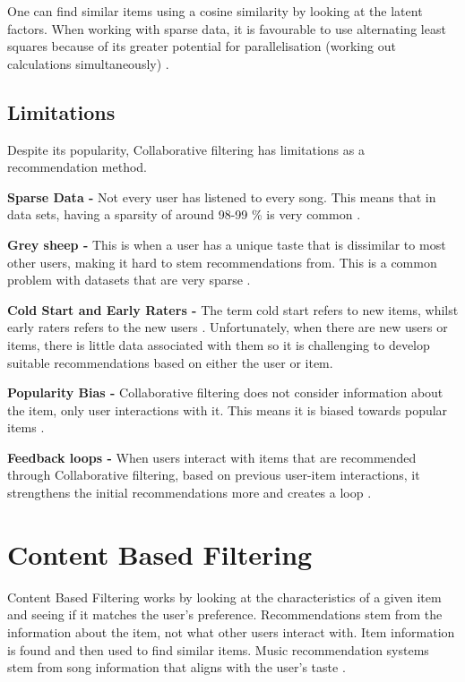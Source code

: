 One can find similar items using a cosine similarity by looking at the latent factors. When working with sparse data, it is favourable to use alternating least squares because of its greater potential for parallelisation (working out calculations simultaneously) \citep{koren_matrix_2009}.

\subsection{Limitations}
Despite its popularity, Collaborative filtering has limitations as a recommendation method.

\textbf{Sparse Data - }Not every user has listened to every song. This means that in data sets, having a sparsity of around 98-99 \% is very common \citep{celma_recommendation_2010}.

\textbf{Grey sheep - }This is when a user has a unique taste that is dissimilar to most other users, making it hard to stem recommendations from. This is a common problem with datasets that are very sparse \citep{claypool_combining_1999}.

\textbf{Cold Start and Early Raters - } The term cold start refers to new items, whilst early raters refers to the new users \citep{avery_recommender_1997}. Unfortunately, when there are new users or items, there is little data associated with them so it is challenging to develop suitable recommendations based on either the user or item. 

\textbf{Popularity Bias - } Collaborative filtering does not consider information about the item, only user interactions with it. This means it is biased towards popular items \citep{celma_recommendation_2010}.

\textbf{Feedback loops - } When users interact with items that are recommended through Collaborative filtering, based on previous user-item interactions, it strengthens the initial recommendations more and creates a loop \citep{sanchez-moreno_incorporating_2018}.

\section{Content Based Filtering}

Content Based Filtering works by looking at the characteristics of a given item and seeing if it matches the user's preference. Recommendations stem from the information about the item, not what other users interact with. Item information is found and then used to find similar items\citep{casey_content-based_2008}. Music recommendation systems stem from song information that aligns with the user's taste \citep{aucouturier_music_2002, logan_music_2004}. 

